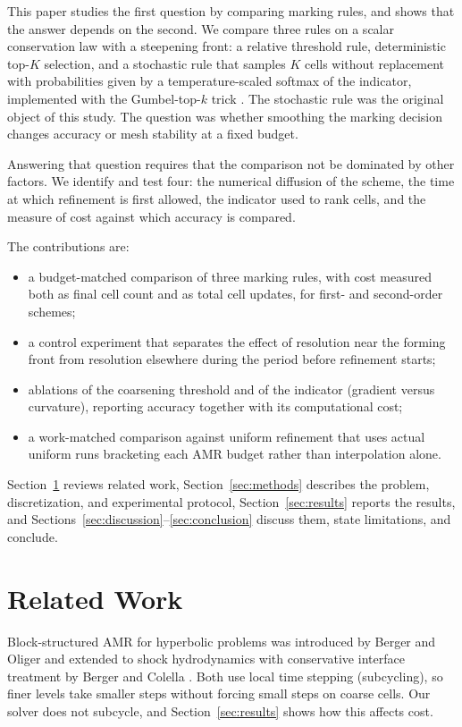\documentclass[conference]{IEEEtran}
\begin{document}
This paper studies the first question by comparing marking rules, and shows that the answer depends on the second. We compare three rules on a scalar conservation law with a steepening front: a relative threshold rule, deterministic top-$K$ selection, and a stochastic rule that samples $K$ cells without replacement with probabilities given by a temperature-scaled softmax of the indicator, implemented with the Gumbel-top-$k$ trick \cite{kool2019}. The stochastic rule was the original object of this study. The question was whether smoothing the marking decision changes accuracy or mesh stability at a fixed budget.

Answering that question requires that the comparison not be dominated by other factors. We identify and test four: the numerical diffusion of the scheme, the time at which refinement is first allowed, the indicator used to rank cells, and the measure of cost against which accuracy is compared.

The contributions are:
\begin{itemize}
\item a budget-matched comparison of three marking rules, with cost measured both as final cell count and as total cell updates, for first- and second-order schemes;
\item a control experiment that separates the effect of resolution near the forming front from resolution elsewhere during the period before refinement starts;
\item ablations of the coarsening threshold and of the indicator (gradient versus curvature), reporting accuracy together with its computational cost;
\item a work-matched comparison against uniform refinement that uses actual uniform runs bracketing each AMR budget rather than interpolation alone.
\end{itemize}

Section~\ref{sec:related} reviews related work, Section~\ref{sec:methods} describes the problem, discretization, and experimental protocol, Section~\ref{sec:results} reports the results, and Sections~\ref{sec:discussion}--\ref{sec:conclusion} discuss them, state limitations, and conclude.

\section{Related Work}
\label{sec:related}

Block-structured AMR for hyperbolic problems was introduced by Berger and Oliger \cite{berger1984} and extended to shock hydrodynamics with conservative interface treatment by Berger and Colella \cite{berger1989}. Both use local time stepping (subcycling), so finer levels take smaller steps without forcing small steps on coarse cells. Our solver does not subcycle, and Section~\ref{sec:results} shows how this affects cost.
\end{document}
